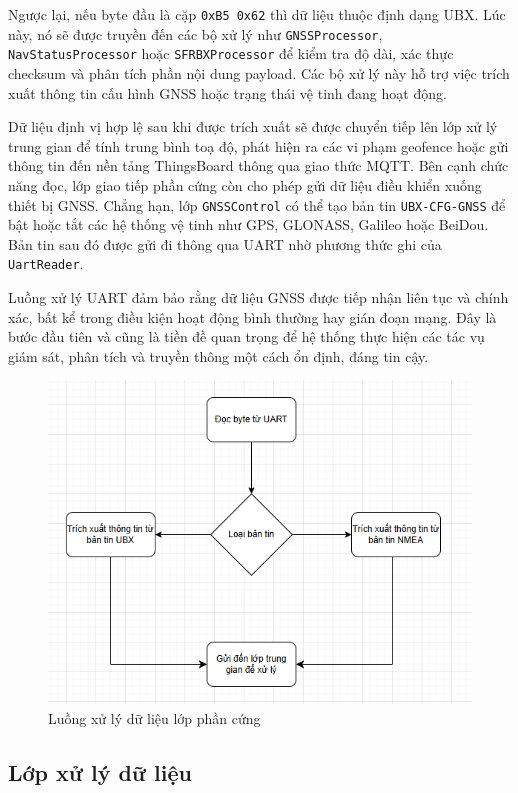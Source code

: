 \documentclass[../DoAn.tex]{subfiles}
\begin{document}
Ngược lại, nếu byte đầu là cặp \texttt{0xB5 0x62} thì dữ liệu thuộc định dạng UBX. Lúc này, nó sẽ được truyền đến các bộ xử lý như \texttt{GNSSProcessor}, \texttt{NavStatusProcessor} hoặc \texttt{SFRBXProcessor} để kiểm tra độ dài, xác thực checksum và phân tích phần nội dung payload. Các bộ xử lý này hỗ trợ việc trích xuất thông tin cấu hình GNSS hoặc trạng thái vệ tinh đang hoạt động.

Dữ liệu định vị hợp lệ sau khi được trích xuất sẽ được chuyển tiếp lên lớp xử lý trung gian để tính trung bình toạ độ, phát hiện ra các vi phạm geofence hoặc gửi thông tin đến nền tảng ThingsBoard thông qua giao thức MQTT. Bên cạnh chức năng đọc, lớp giao tiếp phần cứng còn cho phép gửi dữ liệu điều khiển xuống thiết bị GNSS. Chẳng hạn, lớp \texttt{GNSSControl} có thể tạo bản tin \texttt{UBX-CFG-GNSS} để bật hoặc tắt các hệ thống vệ tinh như GPS, GLONASS, Galileo hoặc BeiDou. Bản tin sau đó được gửi đi thông qua UART nhờ phương thức ghi của \texttt{UartReader}.

Luồng xử lý UART đảm bảo rằng dữ liệu GNSS được tiếp nhận liên tục và chính xác, bất kể trong điều kiện hoạt động bình thường hay gián đoạn mạng. Đây là bước đầu tiên và cũng là tiền đề quan trọng để hệ thống thực hiện các tác vụ giám sát, phân tích và truyền thông một cách ổn định, đáng tin cậy.
\begin{figure}[H]
    \includegraphics[width=\linewidth]{Hinhve/HardwareFlow.png}
    \caption{ Luồng xử lý dữ liệu lớp phần cứng}
    \label{fig:label}
\end{figure}
\subsection{Lớp xử lý dữ liệu}
\label{subsection:4.2.2}
\end{document}
